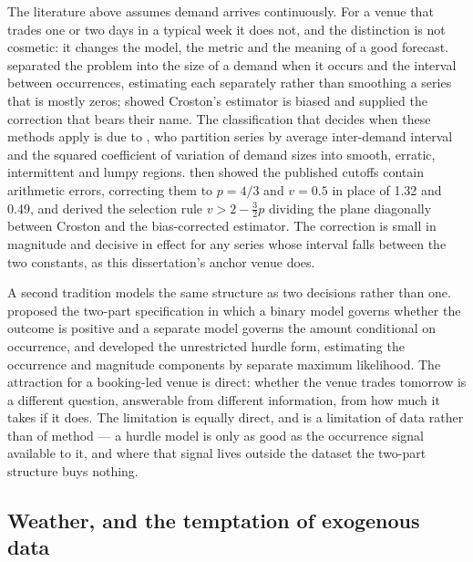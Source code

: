 The literature above assumes demand arrives continuously. For a venue that
trades one or two days in a typical week it does not, and the distinction is
not cosmetic: it changes the model, the metric and the meaning of a good
forecast. \citet{croston_forecasting_1972} separated the problem into the size
of a demand when it occurs and the interval between occurrences, estimating
each separately rather than smoothing a series that is mostly zeros;
\citet{syntetos_accuracy_2005} showed Croston's estimator is biased and
supplied the correction that bears their name. The classification that decides
when these methods apply is due to \citet{syntetos_categorization_2005}, who
partition series by average inter-demand interval and the squared coefficient
of variation of demand sizes into smooth, erratic, intermittent and lumpy
regions. \citet{kostenko_note_2006} then showed the published cutoffs contain
arithmetic errors, correcting them to $p = 4/3$ and $v = 0.5$ in place of 1.32
and 0.49, and derived the selection rule $v > 2 - \tfrac{3}{2}p$ dividing the
plane diagonally between Croston and the bias-corrected estimator. The
correction is small in magnitude and decisive in effect for any series whose
interval falls between the two constants, as this dissertation's anchor venue
does.

A second tradition models the same structure as two decisions rather than one.
\citet{cragg_statistical_1971} proposed the two-part specification in which a
binary model governs whether the outcome is positive and a separate model
governs the amount conditional on occurrence, and \citet{mullahy_specification_1986}
developed the unrestricted hurdle form, estimating the occurrence and magnitude
components by separate maximum likelihood. The attraction for a booking-led
venue is direct: whether the venue trades tomorrow is a different question,
answerable from different information, from how much it takes if it does. The
limitation is equally direct, and is a limitation of data rather than of
method --- a hurdle model is only as good as the occurrence signal available to
it, and where that signal lives outside the dataset the two-part structure
buys nothing.

\subsection*{Weather, and the temptation of exogenous data}


